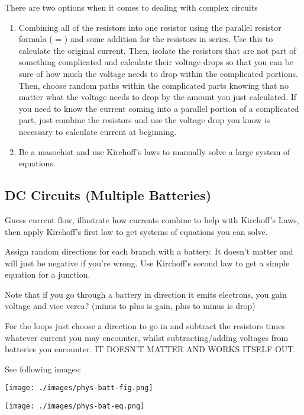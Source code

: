 \documentclass[letterpaper]{article}
\begin{document}
There are two options when it comes to dealing with complex circuits
\begin{enumerate}
\item Combining all of the resistors into one resistor using the parallel resistor formula ( =  ) and some addition for the resistors in series. Use this to calculate the original current. Then, isolate the resistors that are not part of something complicated and calculate their voltage drops so that you can be sure of how much the voltage needs to drop within the complicated portions. Then, choose random paths within the complicated parts knowing that no matter what the voltage needs to drop by the amount you just calculated. If you need to know the current coming into a parallel portion of a complicated part, just combine the resistors and use the voltage drop you know is necessary to calculate current at beginning.
\item Be a masochist and use Kirchoff's laws to manually solve a large system of equations.
\end{enumerate}

\subsection{DC Circuits (Multiple Batteries)}
\label{sec:org1b0ea0b}

Guess current flow, illustrate how currents combine to help with Kirchoff's Laws, then apply Kirchoff's first law to get systems of equations you can solve.

Assign random directions for each branch with a battery. It doesn't matter and will just be negative if you're wrong. Use Kirchoff's second law to get a simple equation for a junction.

Note that if you go through a battery in direction it emits electrons, you gain voltage and vice verca? (minus to plus is gain, plus to minus is drop)

For the loops just choose a direction to go in and subtract the resistors times whatever current you may encounter, whilst subtracting/adding voltages from batteries you encounter. IT DOESN'T MATTER AND WORKS ITSELF OUT.

See following images:
\begin{center}
\texttt{[image: ./images/phys-batt-fig.png]}
\end{center}
\begin{center}
\texttt{[image: ./images/phys-bat-eq.png]}
\end{center}
\end{document}
